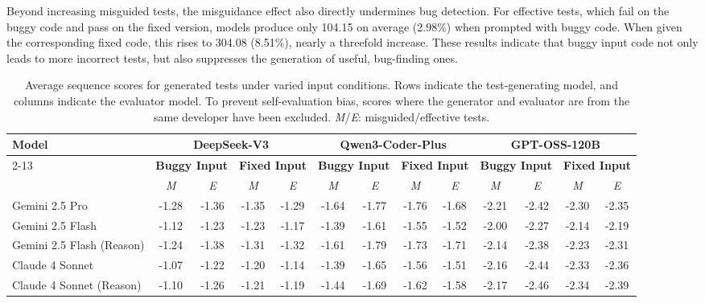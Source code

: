 \documentclass[acmsmall]{acmart}
\begin{document}
Beyond increasing misguided tests, the misguidance effect also directly undermines bug detection. For effective tests, which fail on the buggy code and pass on the fixed version, models produce only 104.15 on average (2.98\%) when prompted with buggy code. When given the corresponding fixed code, this rises to 304.08 (8.51\%), nearly a threefold increase. These results indicate that buggy input code not only leads to more incorrect tests, but also suppresses the generation of useful, bug-finding ones.
\begin{table}[b]
\vspace{-0.5em}
\centering
\setlength{\tabcolsep}{2.5pt}
\tiny
\caption{Average sequence scores for generated tests under varied input conditions. Rows indicate the test-generating model, and columns indicate the evaluator model. To prevent self-evaluation bias, scores where the generator and evaluator are from the same developer have been excluded. \emph{M}/\emph{E}: misguided/effective tests.}
\vspace{-0.4em}
\label{tab:sequence_score}
\begin{tabular}{l | c c | c c | c c | c c | c c | c c}
\toprule
\multirow{4}{*}{\textbf{Model}} & \multicolumn{4}{c|}{\textbf{DeepSeek-V3}} & \multicolumn{4}{c|}{\textbf{Qwen3-Coder-Plus}} & \multicolumn{4}{c}{\textbf{GPT-OSS-120B}}\\
\cmidrule{2-13}
& \multicolumn{2}{c|}{\textbf{Buggy Input}} & \multicolumn{2}{c|}{\textbf{Fixed Input}} & \multicolumn{2}{c|}{\textbf{Buggy Input}} & \multicolumn{2}{c|}{\textbf{Fixed Input}} & \multicolumn{2}{c|}{\textbf{Buggy Input}} & \multicolumn{2}{c}{\textbf{Fixed Input}} \\
& \emph{M} & \emph{E} &  \emph{M} & \emph{E} & \emph{M} & \emph{E} &  \emph{M} & \emph{E} & \emph{M} & \emph{E} &  \emph{M} & \emph{E}\\
\midrule
Gemini 2.5 Pro & -1.28 & -1.36 & -1.35 & -1.29 & -1.64 & -1.77 & -1.76 & -1.68 & -2.21 & -2.42 & -2.30 & -2.35 \\
Gemini 2.5 Flash & -1.12 & -1.23 & -1.23 & -1.17 & -1.39 & -1.61 & -1.55 & -1.52 & -2.00 & -2.27 & -2.14 & -2.19 \\
Gemini 2.5 Flash (Reason) & -1.24 & -1.38 & -1.31 & -1.32 & -1.61 & -1.79 & -1.73 & -1.71 & -2.14 & -2.38 & -2.23 & -2.31 \\
Claude 4 Sonnet & -1.07 & -1.22 & -1.20 & -1.14 & -1.39 & -1.65 & -1.56 & -1.51 & -2.16 & -2.44 & -2.33 & -2.36 \\
Claude 4 Sonnet (Reason) & -1.10 & -1.26 & -1.21 & -1.19 & -1.44 & -1.69 & -1.62 & -1.58 & -2.17 & -2.46 & -2.34 & -2.39 \\

\end{tabular}
\end{table}
\end{document}
